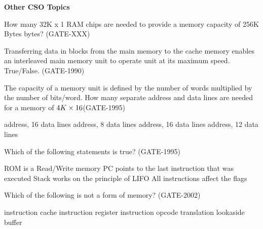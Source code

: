 
\centerline{\textbf{ \LARGE Other CSO Topics}}


\begin{questyle}

  \question  How many 32K x 1 RAM chips are needed to provide a memory capacity of 256K Bytes bytes? (GATE-XXX)

  \begin{oneparchoices}
  \end{oneparchoices}

\end{questyle}


\begin{questyle}

  \question  Transferring data in blocks from the main memory to the cache memory enables an interleaved main memory unit to operate unit at its maximum speed. True/False. (GATE-1990)

\end{questyle}




\begin{questyle}

  \question  The capacity of a memory unit is defined by the number of words multiplied by the number of bits/word. How many separate address and data lines are needed for a memory of \( \large 4K \times 16 \)(GATE-1995)

  \begin{choices}
     address, 16 data lines
     address, 8 data lines
     address, 16 data lines
     address, 12 data lines
  \end{choices}

\end{questyle}

\begin{questyle}
  \question  Which of the following statements is true?  (GATE-1995)

  \begin{choices}
    \choice         ROM is a Read/Write memory
    \choice         PC points to the last instruction that was executed
    \CorrectChoice  Stack works on the principle of LIFO
    \choice         All instructions affect the flags
  \end{choices}
\end{questyle}

\begin{questyle}
  \question  Which of the following is not a form of memory?  (GATE-2002)

  \begin{oneparchoices}
    \choice         instruction cache
    \choice         instruction register
    \CorrectChoice  instruction opcode
    \choice         translation lookaside buffer
  \end{oneparchoices}
\end{questyle}

